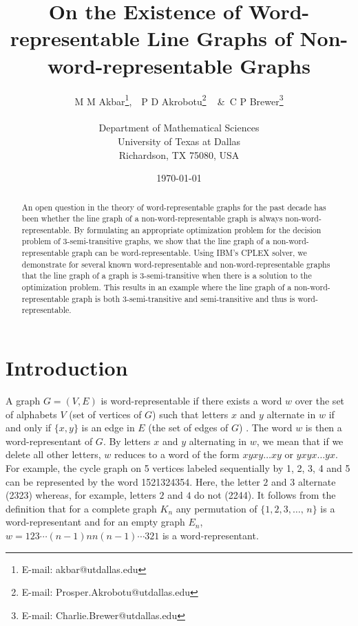 \documentclass{article}
\title{{\Large \bf{On the Existence of Word-representable Line Graphs of Non-word-representable Graphs}}}
\author{
M M Akbar\footnote{E-mail: akbar@utdallas.edu},
\,\,
P D Akrobotu\footnote{E-mail: Prosper.Akrobotu@utdallas.edu}
\ \,\,\&\,
C P Brewer\footnote{E-mail: Charlie.Brewer@utdallas.edu}
\\
\\ {{Department of Mathematical Sciences}}
\\ {University of Texas at Dallas}
\\ {Richardson, TX 75080, USA}}
\date{\today}
\begin{document}
\maketitle
\begin{abstract}
An open question in the theory of word-representable graphs for the past decade has been whether the line graph of a non-word-representable graph is always non-word-representable. By formulating an appropriate optimization problem for the decision problem of 3-semi-transitive graphs, we show that the line graph of a non-word-representable graph can be word-representable. 
 Using IBM's CPLEX solver, we demonstrate for several known word-representable and non-word-representable graphs that the line graph of a graph is 3-semi-transitive when there is a solution to the optimization problem. This results in an example where the line graph of a non-word-representable graph is both 3-semi-transitive and semi-transitive and thus is word-representable.
\end{abstract}

\section{Introduction}
 A graph $G=(V,E)$ is word-representable if there exists a word $w$ over the set of alphabets $V$ (set of vertices of $G$) such that letters $x$ and $y$ alternate in $w$ if and only if $\{x,y\}$ is an edge in $E$ (the set of edges of $G$) \cite{KitaevLozin, KP2008}. The word $w$ is then a word-representant of $G$. By letters $x$ and $y$ alternating in $w$, we mean that if we delete all other letters, $w$ reduces to a word of the form $xyxy\ldots xy$ or $yxyx\ldots yx$.
For example, the cycle graph on 5 vertices labeled sequentially by 1, 2, 3, 4 and 5 can be represented by the word 1521324354. Here, the letter $2$ and $3$ alternate (2323) whereas, for example, letters $2$ and $4$ do not (2244). It follows from the definition that for a complete graph $K_{n}$  any permutation of $\{1,2,3,\ldots,\,n\}$ is a word-representant and for an empty graph $E_{n}$, $w=123\cdots (n-1)nn(n-1)\cdots 321$ is a word-representant.
\end{document}
